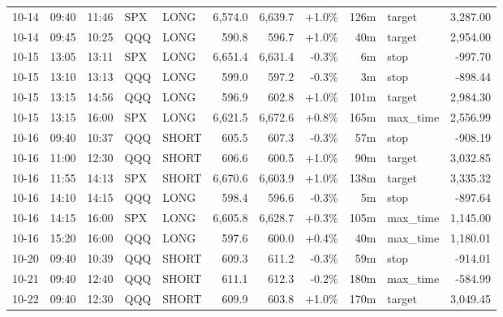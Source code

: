 \documentclass[11pt,a4paper,twoside]{article}
\begin{document}
\begin{center}
\begin{longtable}{>{\color{txtmain}}l l l l l r r r r >{\color{txtmain}}l r}
10-14 & 09:40 & 11:46 & SPX & LONG & 6,574.0 & 6,639.7 & \textcolor{wingreen}{+1.0\%} & 126m & target & \textcolor{wingreen}{3,287.00} \\
10-14 & 09:45 & 10:25 & QQQ & LONG & 590.8 & 596.7 & \textcolor{wingreen}{+1.0\%} & 40m & target & \textcolor{wingreen}{2,954.00} \\
10-15 & 13:05 & 13:11 & SPX & LONG & 6,651.4 & 6,631.4 & \textcolor{lossred}{-0.3\%} & 6m & stop & \textcolor{lossred}{-997.70} \\
10-15 & 13:10 & 13:13 & QQQ & LONG & 599.0 & 597.2 & \textcolor{lossred}{-0.3\%} & 3m & stop & \textcolor{lossred}{-898.44} \\
10-15 & 13:15 & 14:56 & QQQ & LONG & 596.9 & 602.8 & \textcolor{wingreen}{+1.0\%} & 101m & target & \textcolor{wingreen}{2,984.30} \\
10-15 & 13:15 & 16:00 & SPX & LONG & 6,621.5 & 6,672.6 & \textcolor{wingreen}{+0.8\%} & 165m & max\_time & \textcolor{wingreen}{2,556.99} \\
10-16 & 09:40 & 10:37 & QQQ & SHORT & 605.5 & 607.3 & \textcolor{lossred}{-0.3\%} & 57m & stop & \textcolor{lossred}{-908.19} \\
10-16 & 11:00 & 12:30 & QQQ & SHORT & 606.6 & 600.5 & \textcolor{wingreen}{+1.0\%} & 90m & target & \textcolor{wingreen}{3,032.85} \\
10-16 & 11:55 & 14:13 & SPX & SHORT & 6,670.6 & 6,603.9 & \textcolor{wingreen}{+1.0\%} & 138m & target & \textcolor{wingreen}{3,335.32} \\
10-16 & 14:10 & 14:15 & QQQ & LONG & 598.4 & 596.6 & \textcolor{lossred}{-0.3\%} & 5m & stop & \textcolor{lossred}{-897.64} \\
10-16 & 14:15 & 16:00 & SPX & LONG & 6,605.8 & 6,628.7 & \textcolor{wingreen}{+0.3\%} & 105m & max\_time & \textcolor{wingreen}{1,145.00} \\
10-16 & 15:20 & 16:00 & QQQ & LONG & 597.6 & 600.0 & \textcolor{wingreen}{+0.4\%} & 40m & max\_time & \textcolor{wingreen}{1,180.01} \\
10-20 & 09:40 & 10:39 & QQQ & SHORT & 609.3 & 611.2 & \textcolor{lossred}{-0.3\%} & 59m & stop & \textcolor{lossred}{-914.01} \\
10-21 & 09:40 & 12:40 & QQQ & SHORT & 611.1 & 612.3 & \textcolor{lossred}{-0.2\%} & 180m & max\_time & \textcolor{lossred}{-584.99} \\
10-22 & 09:40 & 12:30 & QQQ & SHORT & 609.9 & 603.8 & \textcolor{wingreen}{+1.0\%} & 170m & target & \textcolor{wingreen}{3,049.45} \\

\end{longtable}
\end{center}
\end{document}
